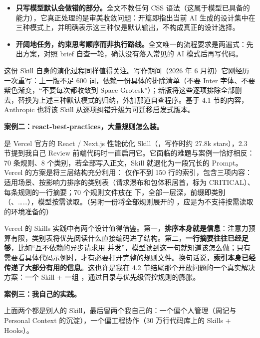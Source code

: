 \begin{itemize}
  \item \textbf{只写模型默认会做错的部分。}全文不教任何 CSS 语法（这属于模型已具备的能力），它真正处理的是审美收敛问题：开篇即指出当前 AI 生成的设计集中在三种模式上，并明确表示这三种仅是默认输出，不构成真正的设计选择。
  \item \textbf{开阔地任务，约束思考顺序而非执行路线。}全文唯一的流程要求是两遍式：先出方案，对照 brief 自查一轮，确认没有落入常见的 AI 模式后再写代码。
\end{itemize}

这份 Skill 自身的演化过程同样值得关注。写作期间（2026 年 6 月初）它刚经历一次重写：上一版不足 600 词，依赖一份具体的排除清单（不要 Inter 字体、不要紫色渐变，“不要每次都收敛到 Space Grotesk”）；新版将这些逐项排除全部删去，替换为上述三种默认模式的归纳，外加那道自查程序。基于 4.1 节的内容，Anthropic 也将该 Skill 从逐项纠错升级为可迁移启发式版本。

\textbf{案例二：react-best-practices，大量规则怎么装。}

 是 Vercel 官方的 React / Next.js 性能优化 Skill（，写作时约 27.8k stars），2.3 节提到我自己 Review 前端代码时一直启用它。它面临的难题与案例一恰好相反：70 条规则、8 个类别，若全部写入正文，Skill 就退化为一段冗长的 Prompt。Vercel 的方案是将三层结构充分利用： 仅作不到 150 行的索引，包含三项内容：适用场景、按影响力排序的类别表（请求瀑布和包体积居首，标为 CRITICAL）、每条规则的一行摘要；70 个规则文件放在  下，全部一层深，前缀即类别（、……），模型按需读取。（另附一份将全部规则展开的 ，应是为不支持按需读取的环境准备的）

Vercel 的 Skills 实践中有两个设计值得借鉴。第一，\textbf{排序本身就是信息}：注意力预算有限，类别表将优先阅读什么直接编码进了结构。第二，\textbf{一行摘要往往已经足够}，比如“互不依赖的异步请求用  并发”，模型读到这一句就知道该怎么做；只有需要看具体代码示例时，才有必要打开完整的规则文件。换句话说，\textbf{索引本身已经传递了大部分有用的信息}。这也许是我在 4.2 节结尾那个开放问题的一个真实解决方案：一个 Skill + 一组 ，通过目录与优先级管控规则的膨胀。

\textbf{案例三：我自己的实践。}

上面两个都是别人的 Skill，最后留两个我自己的：一个偏个人管理（周记与 Personal Context 的沉淀），一个偏工程协作（30 万行代码库上的 Skills + Hooks）。


